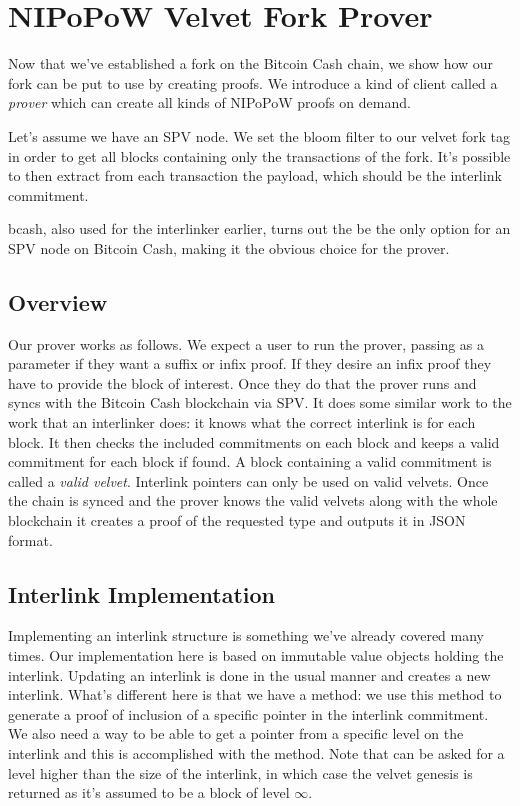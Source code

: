 \chapter{NIPoPoW Velvet Fork Prover}
\label{chap:prover}
Now that we've established a fork on the Bitcoin Cash chain, we show how our fork can be put to use by creating proofs. We introduce a kind of client called a \emph{prover} which can create all kinds of NIPoPoW proofs on demand.

Let's assume we have an SPV node. We set the bloom filter to our velvet fork tag in order to get all blocks containing only the transactions of the fork. It's possible to then extract from each transaction the payload, which should be the interlink commitment. 

bcash, also used for the interlinker earlier, turns out the be the only option for an SPV node on Bitcoin Cash, making it the obvious choice for the prover.

\section{Overview}
Our prover works as follows. We expect a user to run the prover, passing as a parameter if they want a suffix or infix proof. If they desire an infix proof they have to provide the block of interest. Once they do that the prover runs and syncs with the Bitcoin Cash blockchain via SPV. It does some similar work to the work that an interlinker does: it knows what the correct interlink is for each block. It then checks the included commitments on each block and keeps a valid commitment for each block if found. A block containing a valid commitment is called a \emph{valid velvet}. Interlink pointers can only be used on valid velvets. Once the chain is synced and the prover knows the valid velvets along with the whole blockchain it creates a proof of the requested type and outputs it in JSON format.

\section{Interlink Implementation}
Implementing an interlink structure is something we've already covered many times. Our implementation here is based on immutable value objects holding the interlink. Updating an interlink is done in the usual manner and creates a new interlink. What's different here is that we have a  method: we use this method to generate a proof of inclusion of a specific pointer in the interlink commitment. We also need a way to be able to get a pointer from a specific level on the interlink and this is accomplished with the  method. Note that  can be asked for a level higher than the size of the interlink, in which case the velvet genesis is returned as it's assumed to be a block of level $\infty$.

